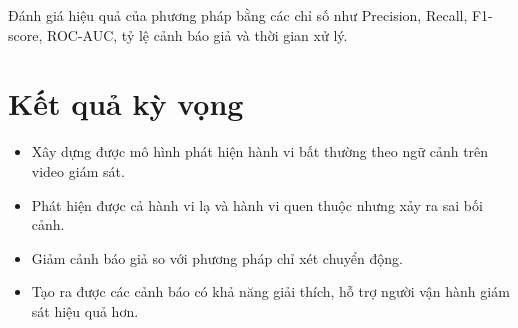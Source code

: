 Đánh giá hiệu quả của phương pháp bằng các chỉ số như Precision, Recall, F1-score, ROC-AUC, tỷ lệ cảnh báo giả và thời gian xử lý.

\section{Kết quả kỳ vọng}

\begin{itemize}
    \item Xây dựng được mô hình phát hiện hành vi bất thường theo ngữ cảnh trên video giám sát.
    \item Phát hiện được cả hành vi lạ và hành vi quen thuộc nhưng xảy ra sai bối cảnh.
    \item Giảm cảnh báo giả so với phương pháp chỉ xét chuyển động.
    \item Tạo ra được các cảnh báo có khả năng giải thích, hỗ trợ người vận hành giám sát hiệu quả hơn.
\end{itemize}
